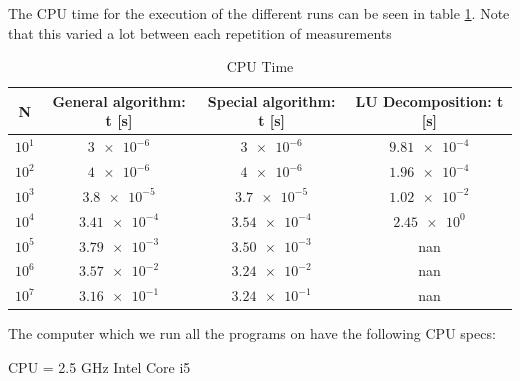 \documentclass[american,a4paper,12pt]{article}
\begin{document}
  The CPU time for the execution of the different runs can be seen in table \ref{tab:final_res}. Note that this varied a lot between each repetition of measurements
  \begin{table}[H]
    \begin{center}
    \caption{CPU Time}
    \begin{tabular}{|c|c|c|c|} \hline
    \textbf{N} & \textbf{General algorithm: t [s]} & \textbf{Special algorithm: t [s]} & \textbf{LU Decomposition: t [s]} \\ \hline
    $10^1$ & $\num{3e-6}$     & $\num{3e-6}$    & $\num{9.81e-4}$ \\ \hline
    $10^2$ & $\num{4e-6}$     & $\num{4e-6}$    & $\num{1.96e-4}$ \\ \hline
    $10^3$ & $\num{3.8e-5}$   & $\num{3.7e-5}$  & $\num{1.02e-2}$ \\ \hline
    $10^4$ & $\num{3.41e-4}$  & $\num{3.54e-4}$ & $\num{2.45e0}$ \\ \hline
    $10^5$ & $\num{3.79e-3}$  & $\num{3.50e-3}$ & nan \\ \hline
    $10^6$ & $\num{3.57e-2}$  & $\num{3.24e-2}$ & nan \\ \hline
    $10^7$ & $\num{3.16e-1}$  & $\num{3.24e-1}$ & nan \\ \hline
    \end{tabular}
    \end{center}
    \label{tab:final_res}
  \end{table}
  The computer which we run all the programs on have the following CPU specs:
  \begin{center}
    CPU = 2.5 GHz Intel Core i5
  \end{center}
\end{document}
